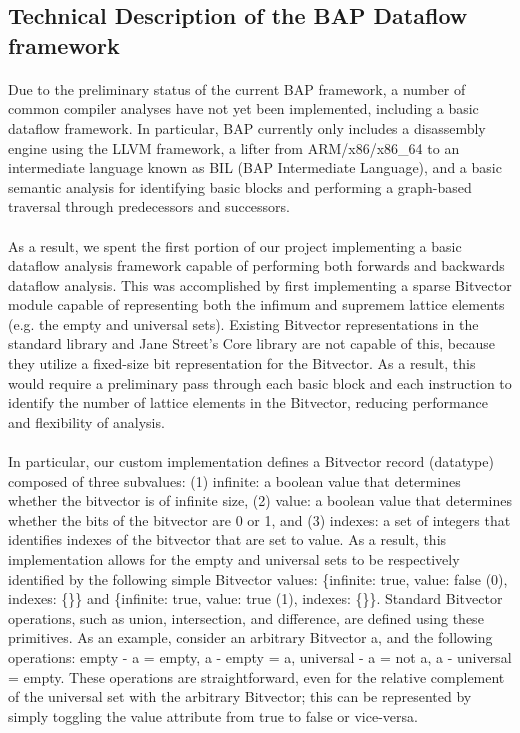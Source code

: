 \documentclass[letterpaper,11pt]{article}
\begin{document}
\subsection{Technical Description of the BAP Dataflow framework}

\paragraph{}
Due to the preliminary status of the current BAP framework, a number of common
compiler analyses have not yet been implemented, including a basic dataflow
framework. In particular, BAP currently only includes a disassembly engine
using the LLVM framework, a lifter from ARM/x86/x86\_64 to an intermediate
language known as BIL (BAP Intermediate Language), and a basic semantic
analysis for identifying basic blocks and performing a graph-based traversal
through predecessors and successors.

\paragraph{}
As a result, we spent the first portion of our project implementing a basic
dataflow analysis framework capable of performing both forwards and backwards
dataflow analysis. This was accomplished by first implementing a sparse
Bitvector module capable of representing both the infimum and supremem lattice
elements (e.g. the empty and universal sets). Existing Bitvector
representations in the standard library and Jane Street’s Core library are not
capable of this, because they utilize a fixed-size bit representation for the
Bitvector. As a result, this would require a preliminary pass through each
basic block and each instruction to identify the number of lattice elements in
the Bitvector, reducing performance and flexibility of analysis.

\paragraph{}
In particular, our custom implementation defines a Bitvector record (datatype)
composed of three subvalues: (1) infinite: a boolean value that determines
whether the bitvector is of infinite size, (2) value: a boolean value that
determines whether the bits of the bitvector are 0 or 1, and (3) indexes: a set
of integers that identifies indexes of the bitvector that are set to value. As
a result, this implementation allows for the empty and universal sets to be
respectively identified by the following simple Bitvector values: \{infinite:
true, value: false (0), indexes: \{\}\} and \{infinite: true, value: true (1),
indexes: \{\}\}. Standard Bitvector operations, such as union, intersection, and
difference, are defined using these primitives. As an example, consider an
arbitrary Bitvector a, and the following operations: empty - a = empty, a -
empty = a, universal - a = not a, a - universal = empty. These operations are
straightforward, even for the relative complement of the universal set with the
arbitrary Bitvector; this can be represented by simply toggling the value
attribute from true to false or vice-versa.
\end{document}
